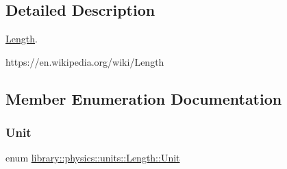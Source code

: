 \subsection{Detailed Description}
\hyperlink{classlibrary_1_1physics_1_1units_1_1_length}{Length}. 

https\+://en.wikipedia.\+org/wiki/\+Length 

\subsection{Member Enumeration Documentation}
\mbox{\label{classlibrary_1_1physics_1_1units_1_1_length_a3b8b39cd245cf6b19dc34459baeccb18}} 
\subsubsection{\texorpdfstring{Unit}{Unit}}
{\footnotesize\ttfamily enum \hyperlink{classlibrary_1_1physics_1_1units_1_1_length_a3b8b39cd245cf6b19dc34459baeccb18}{library\+::physics\+::units\+::\+Length\+::\+Unit}\hspace{0.3cm}{\ttfamily [strong]}}

